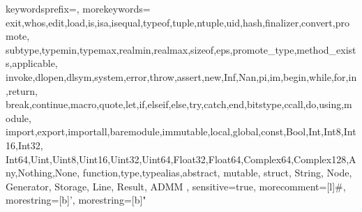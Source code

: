 


\usepackage{listings}
\renewcommand{\lstlistlistingname}{List of \lstlistingname s}
\usepackage{inconsolata} %
\usepackage[usenames,dvipsnames]{color} %


{
  keywordsprefix=\@,
  morekeywords={
    exit,whos,edit,load,is,isa,isequal,typeof,tuple,ntuple,uid,hash,finalizer,convert,promote,
    subtype,typemin,typemax,realmin,realmax,sizeof,eps,promote_type,method_exists,applicable,
    invoke,dlopen,dlsym,system,error,throw,assert,new,Inf,Nan,pi,im,begin,while,for,in,return,
    break,continue,macro,quote,let,if,elseif,else,try,catch,end,bitstype,ccall,do,using,module,
    import,export,importall,baremodule,immutable,local,global,const,Bool,Int,Int8,Int16,Int32,
    Int64,Uint,Uint8,Uint16,Uint32,Uint64,Float32,Float64,Complex64,Complex128,Any,Nothing,None,
    function,type,typealias,abstract, mutable, struct, String, Node, Generator, Storage, Line, Result, ADMM
  },
  sensitive=true,
  morecomment=[l]{\#},
  morestring=[b]',
  morestring=[b]" 
}

\usepackage{graphicx}
\graphicspath{ {./images/} }

\usepackage{url}



\makeatletter
\def\chfootnote{\xdef\@thefnmark{}\@footnotetext}

